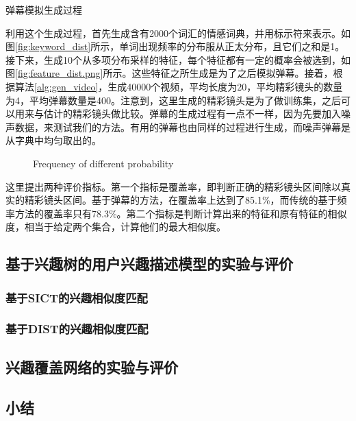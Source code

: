 \begin{algorithm}[!bht]
\caption{弹幕模拟生成过程}
\label{alg:gen_video}
\end{algorithm}

利用这个生成过程，首先生成含有2000个词汇的情感词典，并用标示符来表示。如图\ref{fig:keyword_dist}所示，单词出现频率的分布服从正太分布，且它们之和是1。接下来，生成10个从多项分布采样的特征，每个特征都有一定的概率会被选到，如图\ref{fig:feature_dist.png}所示。这些特征之所生成是为了之后模拟弹幕。接着，根据算法\ref{alg:gen_video}，生成40000个视频，平均长度为20，平均精彩镜头的数量为4，平均弹幕数量是400。注意到，这里生成的精彩镜头是为了做训练集，之后可以用来与估计的精彩镜头做比较。弹幕的生成过程有一点不一样，因为先要加入噪声数据，来测试我们的方法。有用的弹幕也由同样的过程进行生成，而噪声弹幕是从字典中均匀取出的。

\begin{figure}[!hbt]
  \hfill
  \hfill
\caption{Frequency of different probability}
\end{figure}

这里提出两种评价指标。第一个指标是覆盖率，即判断正确的精彩镜头区间除以真实的精彩镜头区间。基于弹幕的方法，在覆盖率上达到了85.1\%，而传统的基于频率方法的覆盖率只有78.3\%。第二个指标是判断计算出来的特征和原有特征的相似度，相当于给定两个集合，计算他们的最大相似度。

\subsection{基于兴趣树的用户兴趣描述模型的实验与评价}
\subsubsection{基于SICT的兴趣相似度匹配}
\subsubsection{基于DIST的兴趣相似度匹配}

\subsection{兴趣覆盖网络的实验与评价}


\subsection{小结}
